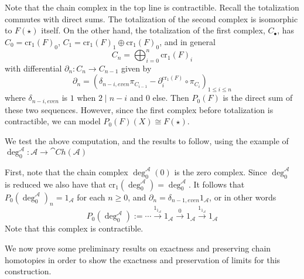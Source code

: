 Note that the chain complex in the top line is contractible. Recall the totalization commutes with direct sums. The totalization of the second complex is isomorphic to $F(\star)$ itself. On the other hand, the totalization of the first complex, $C_\bullet$, has $C_0 = \text{cr}_1(F)_0$, $C_1 = \text{cr}_1(F)_1\oplus \text{cr}_1(F)_0$, and in general
\begin{equation*}
    C_n = \bigoplus_{i=0}^n\text{cr}_1(F)_i
\end{equation*}
with differential $\partial_n:C_n\rightarrow C_{n-1}$ given by 
\begin{equation*}
    \partial_n = (\delta_{n-i,even}\pi_{C_{i-1}}-\partial_i^{\text{cr}_1(F)}\circ \pi_{C_i})_{1\leq i \leq n}
\end{equation*}
where $\delta_{n-i,even}$ is $1$ when $2\mid n-i$ and $0$ else. Then $P_0(F)$ is the direct sum of these two sequences. However, since the first complex before totalization is contractible, we can model $P_0(F)(X) \cong F(\star)$.

We test the above computation, and the results to follow, using the example of $\deg_0^\mathcal{A}:\mathcal{A}\rightarrow \cat{Ch}(\mathcal{A})$

\begin{eg}{}
    First, note that the chain complex $\deg_0^\mathcal{A}(0)$ is the zero complex. Since $\deg_0^\mathcal{A}$ is reduced we also have that $\text{cr}_1(\deg_0^\mathcal{A}) = \deg_0^\mathcal{A}$. It follows that $P_0(\deg_0^\mathcal{A})_n = 1_\mathcal{A}$ for each $n \geq 0$, and $\partial_n = \delta_{n-1,even}1_{\mathcal{A}}$, or in other words
    \begin{equation*}
        P_0(\deg_0^\mathcal{A}) := \cdots \xrightarrow{1_{1_\mathcal{A}}} 1_\mathcal{A}\xrightarrow{0} 1_\mathcal{A}\xrightarrow{1_{1_\mathcal{A}}} 1_\mathcal{A}
    \end{equation*}
    Note that this complex is contractible.
\end{eg}

We now prove some preliminary results on exactness and preserving chain homotopies in order to show the exactness and preservation of limits for this construction.


